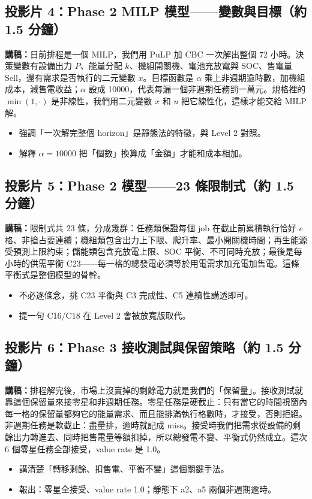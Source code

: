 \documentclass[12pt,a4paper,fontset=none]{ctexart}
\begin{document}
\subsection*{投影片 4：Phase 2 MILP 模型——變數與目標（約 1.5 分鐘）}
\textbf{講稿：}日前排程是一個 MILP，我們用 PuLP 加 CBC 一次解出整個 72 小時。決策變數有設備出力 $P$、能量分配 $k$、機組開關機、電池充放電與 SOC、售電量 Sell，還有需求是否執行的二元變數 $x$。目標函數是 $\alpha$ 乘上非週期逾時數，加機組成本，減售電收益；$\alpha$ 設成 10000，代表每漏一個非週期任務罰一萬元。規格裡的 $\min(1,\cdot)$ 是非線性，我們用二元變數 $x$ 和 $u$ 把它線性化，這樣才能交給 MILP 解。
\begin{itemize}
  \item 強調「一次解完整個 horizon」是靜態法的特徵，與 Level 2 對照。
  \item 解釋 $\alpha=10000$ 把「個數」換算成「金額」才能和成本相加。
\end{itemize}

\subsection*{投影片 5：Phase 2 模型——23 條限制式（約 1.5 分鐘）}
\textbf{講稿：}限制式共 23 條，分成幾群：任務類保證每個 job 在截止前累積執行恰好 $e$ 格、非搶占要連續；機組類包含出力上下限、爬升率、最小開關機時間；再生能源受預測上限約束；儲能類包含充放電上限、SOC 平衡、不可同時充放；最後是每小時的供需平衡 C23——每一格的總發電必須等於用電需求加充電加售電。這條平衡式是整個模型的骨幹。
\begin{itemize}
  \item 不必逐條念，挑 C23 平衡與 C3 完成性、C5 連續性講透即可。
  \item 提一句 C16/C18 在 Level 2 會被放寬版取代。
\end{itemize}

\subsection*{投影片 6：Phase 3 接收測試與保留策略（約 1.5 分鐘）}
\textbf{講稿：}排程解完後，市場上沒賣掉的剩餘電力就是我們的「保留量」。接收測試就靠這個保留量來接零星和非週期任務。零星任務是硬截止：只有當它的時間視窗內每一格的保留量都夠它的能量需求、而且能排滿執行格數時，才接受，否則拒絕。非週期任務是軟截止：盡量排，逾時就記成 miss。接受時我們把需求從設備的剩餘出力轉進去、同時把售電量等額扣掉，所以總發電不變、平衡式仍然成立。這次 6 個零星任務全部接受，value rate 是 1.0。
\begin{itemize}
  \item 講清楚「轉移剩餘、扣售電、平衡不變」這個關鍵手法。
  \item 報出：零星全接受、value rate 1.0；靜態下 a2、a5 兩個非週期逾時。
\end{itemize}
\end{document}
